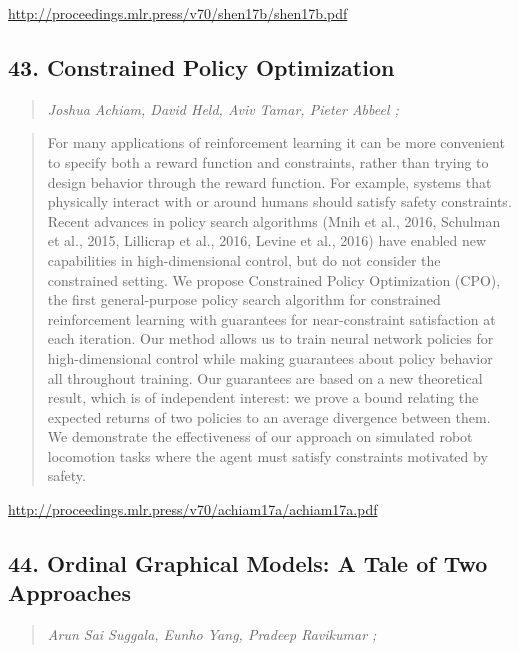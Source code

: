 \documentclass{article}
\begin{document}
\href{http://proceedings.mlr.press/v70/shen17b/shen17b.pdf}{http://proceedings.mlr.press/v70/shen17b/shen17b.pdf}

\subsection{43. Constrained Policy Optimization}

\begin{quote}
\footnotesize{\textit{Joshua Achiam, David Held, Aviv Tamar, Pieter Abbeel ;}}
\end{quote}

\begin{quote}
    For many applications of reinforcement learning it can be more convenient to specify both a reward function and constraints, rather than trying to design behavior through the reward function. For example, systems that physically interact with or around humans should satisfy safety constraints. Recent advances in policy search algorithms (Mnih et al., 2016, Schulman et al., 2015, Lillicrap et al., 2016, Levine et al., 2016) have enabled new capabilities in high-dimensional control, but do not consider the constrained setting. We propose Constrained Policy Optimization (CPO), the first general-purpose policy search algorithm for constrained reinforcement learning with guarantees for near-constraint satisfaction at each iteration. Our method allows us to train neural network policies for high-dimensional control while making guarantees about policy behavior all throughout training. Our guarantees are based on a new theoretical result, which is of independent interest: we prove a bound relating the expected returns of two policies to an average divergence between them. We demonstrate the effectiveness of our approach on simulated robot locomotion tasks where the agent must satisfy constraints motivated by safety.  \end{quote}

\href{http://proceedings.mlr.press/v70/achiam17a/achiam17a.pdf}{http://proceedings.mlr.press/v70/achiam17a/achiam17a.pdf}

\subsection{44. Ordinal Graphical Models: A Tale of Two Approaches}

\begin{quote}
\footnotesize{\textit{Arun Sai Suggala, Eunho Yang, Pradeep Ravikumar ;}}
\end{quote}
\end{document}

